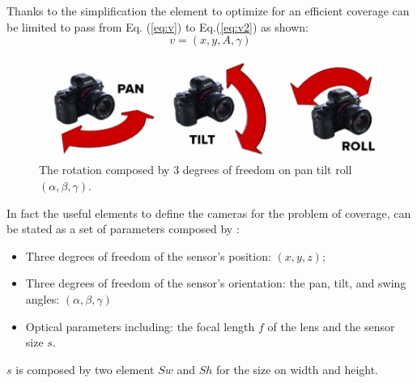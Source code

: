 Thanks to the simplification the element to optimize for an efficient coverage can be limited to pass from Eq. (\ref{eq:v}) to  Eq.(\ref{eq:v2}) as shown: 
\begin{equation}\label{eq:v2}
v=(x,y,A,\gamma )
\end{equation}
%    
 
\begin{figure}[t!]
   \includegraphics[width=\linewidth]{img/PanTiltRoll.png}
  \caption{ The rotation composed by 3 degrees of freedom on pan tilt roll$(\alpha,\beta,\gamma)$.}\label{fig:PanTiltRoll}
  \endminipage\hfill
\end{figure}

In fact the useful elements to define the cameras for the problem of coverage, can be stated as a set of parameters composed by :\\
\begin{itemize}
\item Three degrees of freedom of the sensor’s position: $(x, y, z)$;
\item Three degrees of freedom of the sensor’s orientation: the pan, tilt, and swing angles: $(\alpha,\beta, \gamma)$ 
\item Optical parameters including: the focal length $f$ of the lens and the sensor size $s$.
\end{itemize}
$s$ is composed by two element $Sw$ and $Sh$ for the size on width and height.\\

